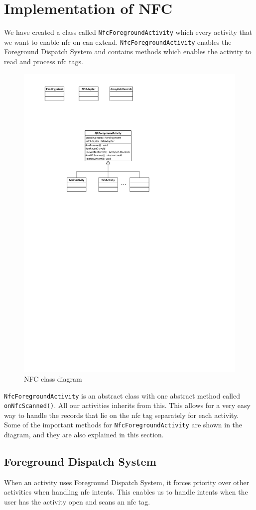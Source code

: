 \section{Implementation of NFC}
We have created a class called \lstinline|NfcForegroundActivity| which every activity that we want to enable \ac{nfc} on can extend. \lstinline|NfcForegroundActivity| enables the Foreground Dispatch System and contains methods which enables the activity to read and process \ac{nfc} tags.

\begin{figure}[H]
\centering
\includegraphics[width=0.55\linewidth, page=2]{img/nfcdiagram.pdf}
\caption{NFC class diagram}
\label{fig:nfcdiagram}
\end{figure}

\lstinline|NfcForegroundActivity| is an abstract class with one abstract method called \lstinline|onNfcScanned()|. All our activities inherits from this. This allows for a very easy way to handle the records that lie on the \ac{nfc} tag separately for each activity. Some of the important methods for \lstinline|NfcForegroundActivity| are shown in the diagram, and they are also explained in this section.

\subsection*{Foreground Dispatch System}
\label{sec:foreground}

When an activity uses Foreground Dispatch System, it forces priority over other activities when handling \ac{nfc} intents\citep{foregroundDispatch}. This enables us to handle intents when the user has the activity open and scans an \ac{nfc} tag.

